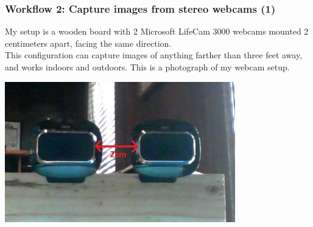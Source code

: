 \documentclass[19pt]{beamer}
\begin{document}
\begin{frame}
\frametitle{Workflow 2: Capture images from stereo webcams (1)}

My setup is a wooden board with 2 Microsoft LifeCam 3000 webcams mounted 2 centimeters apart, facing the same direction. \\[10pt]
%
This configuration can capture images of anything farther than three feet away, and works indoors and outdoors. This is a photograph of my webcam setup.\\

\begin{center}
\includegraphics[width=0.75\textwidth, trim=30 50 45 50, clip]{images/setup.jpg}
\end{center}

\end{frame}
\end{document}
